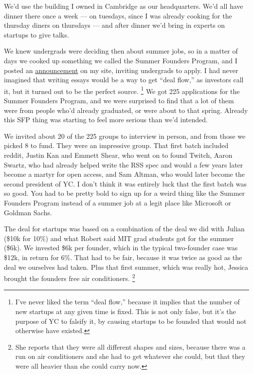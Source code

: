 We'd use the building I owned in Cambridge as our headquarters. We'd all
have dinner there once a week --- on tuesdays, since I was already
cooking for the thursday diners on thursdays --- and after dinner we'd
bring in experts on startups to give talks.

We knew undergrads were deciding then about summer jobs, so in a matter
of days we cooked up something we called the Summer Founders Program,
and I posted an \href{summerfounder.html}{announcement} on my site,
inviting undergrads to apply. I had never imagined that writing essays
would be a way to get ``deal flow,'' as investors call it, but it turned
out to be the perfect source. \footnote{I've never liked the term ``deal flow,'' because it implies
that the number of new startups at any given time is fixed. This is not
only false, but it's the purpose of YC to falsify it, by causing
startups to be founded that would not otherwise have existed.} We got 225
applications for the Summer Founders Program, and we were surprised to
find that a lot of them were from people who'd already graduated, or
were about to that spring. Already this SFP thing was starting to feel
more serious than we'd intended.

We invited about 20 of the 225 groups to interview in person, and from
those we picked 8 to fund. They were an impressive group. That first
batch included reddit, Justin Kan and Emmett Shear, who went on to found
Twitch, Aaron Swartz, who had already helped write the RSS spec and
would a few years later become a martyr for open access, and Sam Altman,
who would later become the second president of YC. I don't think it was
entirely luck that the first batch was so good. You had to be pretty
bold to sign up for a weird thing like the Summer Founders Program
instead of a summer job at a legit place like Microsoft or Goldman
Sachs.

The deal for startups was based on a combination of the deal we did with
Julian (\$10k for 10\%) and what Robert said MIT grad students got for
the summer (\$6k). We invested \$6k per founder, which in the typical
two-founder case was \$12k, in return for 6\%. That had to be fair,
because it was twice as good as the deal we ourselves had taken. Plus
that first summer, which was really hot, Jessica brought the founders
free air conditioners. \footnote{She reports that they were all different shapes and sizes,
because there was a run on air conditioners and she had to get whatever
she could, but that they were all heavier than she could carry now.}

